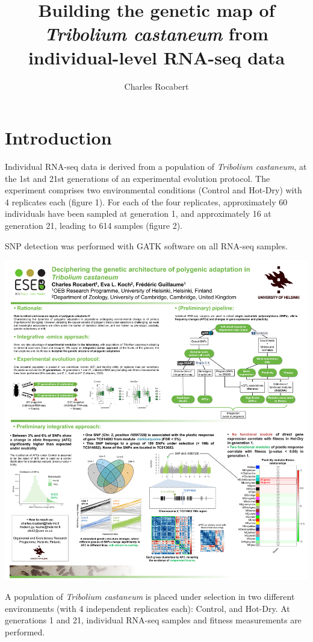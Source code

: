 \documentclass[english, a4paper, 12pt]{article}
\title{Building the genetic map of \textit{Tribolium castaneum} from individual-level RNA-seq data}
\author{Charles Rocabert}
\date{}
\makeatletter
\newenvironment{figurehere}
{\def\@captype{figure}}
{}
\makeatother
\begin{document}

\maketitle


\tableofcontents


\newpage

\section{Introduction}

Individual RNA-seq data is derived from a population of \textit{Tribolium castaneum}, at the 1st and 21st generations of an experimental evolution protocol. The experiment comprises two environmental conditions (Control and Hot-Dry) with 4 replicates each (figure 1). For each of the four replicates, approximately 60 individuals have been sampled at generation 1, and approximately 16 at generation 21, leading to 614 samples (figure 2).

SNP detection was performed with GATK software on all RNA-seq samples.

\hfill

\begin{figurehere}
\centering
\includegraphics[width=0.6\linewidth]{figure1.pdf}
\caption{\small{A population of \textit{Tribolium castaneum} is placed under selection in two different environments (with 4 independent replicates each): Control, and Hot-Dry. At generations 1 and 21, individual RNA-seq samples and fitness measurements are performed.}}
\end{figurehere}
\end{document}
